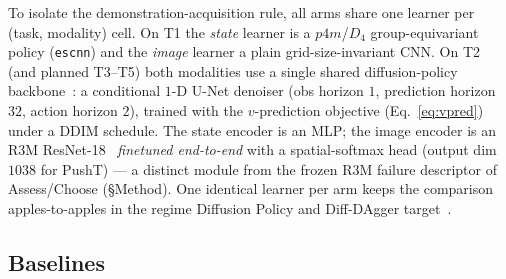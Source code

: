 \documentclass[letterpaper]{article} %
\begin{document}
To isolate the demonstration-acquisition rule, all arms share one learner per
(task, modality) cell. On T1 the \emph{state} learner is a $p4m$/$D_4$
group-equivariant policy (\texttt{escnn}) and the \emph{image} learner a plain
grid-size-invariant CNN. On T2 (and planned T3--T5) both modalities use a single
shared diffusion-policy backbone~\cite{chi2023diffusionpolicy,ho2020ddpm}: a
conditional $1$-D U-Net denoiser (obs horizon $1$, prediction horizon $32$, action
horizon $2$), trained with the $v$-prediction objective (Eq.~\ref{eq:vpred}) under a
DDIM schedule. The state encoder is an MLP; the image encoder is an R3M
ResNet-18~\cite{nair2022r3m} \emph{finetuned end-to-end} with a spatial-softmax head
(output dim $1038$ for PushT) --- a distinct module from the frozen R3M failure
descriptor of Assess/Choose (\S Method). One identical learner per arm keeps the
comparison apples-to-apples in the regime Diffusion Policy and Diff-DAgger
target~\cite{chi2023diffusionpolicy,lee2025diffdagger}.

\subsection{Baselines}
\end{document}
